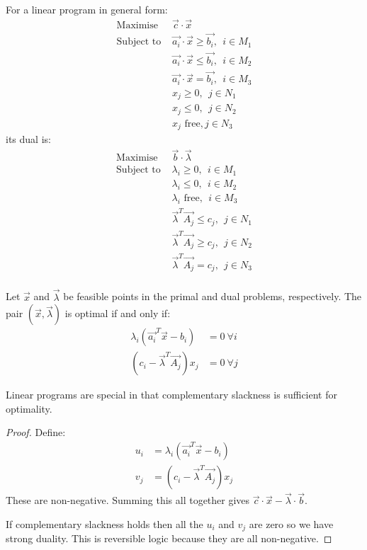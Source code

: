 \documentclass[../Main.tex]{subfiles}
\begin{document}
For a linear program in general form:
\begin{align*}
    \text{Maximise } & \vec{c} \cdot \vec{x} \\
    \text{Subject to } & \vec{a_i} \cdot \vec{x} \geq \vec{b_{i}},~~i \in M_1 \\
    & \vec{a_i} \cdot \vec{x} \leq \vec{b_{i}},~~i \in M_2 \\
    & \vec{a_i} \cdot \vec{x} = \vec{b_{i}},~~i \in M_3 \\
    & x_j \geq 0,~~j \in N_1 \\
    & x_j \leq 0,~~j \in N_2 \\
    & x_j \text{ free},j \in N_3
\end{align*}
its dual is:
\begin{align*}
    \text{Maximise } & \vec{b} \cdot \vec{\lambda} \\
    \text{Subject to } & \lambda_i \geq 0,~~i \in M_1 \\
    & \lambda_i \leq 0,~~i \in M_2 \\
    & \lambda_i \text{ free},~~i \in M_3 \\
    & \vec{\lambda}^T \vec{A_{j}} \leq c_j,~~j \in N_1 \\
    & \vec{\lambda}^T \vec{A_{j}} \geq c_j,~~j \in N_2 \\
    & \vec{\lambda}^T \vec{A_{j}} = c_j,~~j \in N_3 \\
\end{align*}
\begin{theorem}
    Let $\vec{x}$ and $\vec{\lambda}$ be feasible points in the primal and dual problems, respectively. The pair $(\vec{x}, \vec{\lambda})$ is optimal if and only if:
    \begin{align*}
        \lambda_i (\vec{a_{i}}^T \vec{x} - b_i) &= 0 ~\forall i \\
        (c_i - \vec{\lambda}^T \vec{A_{j}})x_j &= 0 ~\forall j
    \end{align*}
    \label{thmLinearProgOptimality}
\end{theorem}
\begin{remark}
    Linear programs are special in that complementary slackness is sufficient for optimality.
\end{remark}
\begin{proof}
    Define:
    \begin{align*}
        u_i &= \lambda_i (\vec{a_{i}}^T \vec{x} - b_i) \\
        v_j &= (c_i - \vec{\lambda}^T \vec{A_{j}})x_j
    \end{align*}
    These are non-negative. Summing this all together gives $\vec{c} \cdot \vec{x} - \vec{\lambda} \cdot \vec{b}$.

    If complementary slackness holds then all the $u_i$ and $v_j$ are zero so we have strong duality. This is reversible logic because they are all non-negative.
\end{proof}
\end{document}
